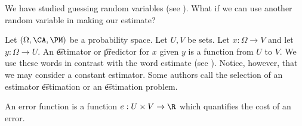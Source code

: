 

We have studied guessing random variables (see ).
What if we can use another random variable in making our estimate?


Let $(\Omega, \CA, \PM)$ be a probability space.
Let $U, V$ be sets.
Let $x: \Omega \to V$ and let $y: \Omega \to U$.
An \t{estimator} or \t{predictor} for $x$ given $y$ is a function from $U$ to $V$.
We use these words in contrast with the word estimate (see ).
Notice, however, that we may consider a constant estimator.
Some authors call the selection of an estimator \t{estimation} or an \t{estimation problem}.


An error function is a function $e: U \times V \to \R$ which quantifies the cost of an error.




\blankpage
